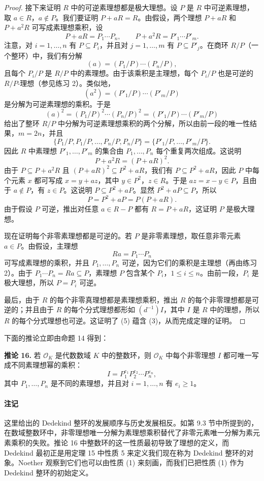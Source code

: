 \begin{proof}
接下来证明 $R$ 中的可逆素理想都是极大理想。设 $P$ 是 $R$ 中可逆素理想，取 $a\in R$，$a\notin P$。我们要证明 $P+aR=R$。由假设，两个理想 $P+aR$ 和 $P+a^2R$ 可写成素理想乘积，设
\[
  P+aR=P_1\cdots P_n,
  \qquad
  P+a^2R=P'_1\cdots P'_m.
\]
注意，对 $i=1,
\ldots,n$ 有 $P\subseteq P_i$，并且对 $j=1,
\ldots,m$ 有 $P\subseteq P'_j$。在商环 $R/P$（一个整环）中，我们有分解
\[
  (a)=(P_1/P)\cdots(P_n/P),
\]
且每个 $P_i/P$ 是 $R/P$ 中的素理想。由于该乘积是主理想，每个 $P_i/P$ 也是可逆的 $R/P$-理想（参见练习 2）。类似地，
\[
  (a^2)=(P'_1/P)\cdots(P'_m/P)
\]
是分解为可逆素理想的乘积。于是
\[
  (a)^2=(P_1/P)^2\cdots(P_n/P)^2=(P'_1/P)\cdots(P'_m/P)
\]
给出了整环 $R/P$ 中分解为可逆素理想乘积的两个分解，所以由前一段的唯一性结果，$m=2n$，并且
\[
  \{P_1/P,P_1/P,
  \ldots,P_n/P,P_n/P\}=\{P'_1/P,
  \ldots,P'_m/P\}.
\]
因此 $R$ 中素理想 $P'_1,
\ldots,P'_m$ 的集合由 $P_1,
\ldots,P_n$ 每个重复两次组成。这说明
\[
  P+a^2R=(P+aR)^2.
\]
由于 $P\subseteq P+a^2R$ 且 $(P+aR)^2\subseteq P^2+aR$，我们有 $P\subseteq P^2+aR$，因此 $P$ 中每个元素 $x$ 都可写成 $x=y+az$，其中 $y\in P^2$，$z\in R$。于是 $az=x-y\in P$，且由于 $a\notin P$，有 $z\in P$。这说明 $P\subseteq P^2+aP$。显然 $P^2+aP\subseteq P$，所以
\[
  P=P^2+aP=P(P+aR).
\]
由于假设 $P$ 可逆，推出对任意 $a\in R-P$ 都有 $R=P+aR$，这证明 $P$ 是极大理想。

现在证明每个非零素理想都是可逆的。若 $P$ 是非零素理想，取任意非零元素 $a\in P$。由假设，主理想
\[
  Ra=P_1\cdots P_n
\]
可写成素理想的乘积，并且 $P_1,
\ldots,P_n$ 可逆，因为它们的乘积是主理想（再由练习 2）。由于 $P_1\cdots P_n=Ra\subseteq P$，素理想 $P$ 包含某个 $P_i$，$1\leq i\leq n$。由前一段，$P_i$ 是极大理想，所以 $P=P_i$ 可逆。

最后，由于 $R$ 的每个非零真理想都是素理想乘积，推出 $R$ 的每个非零理想都是可逆的；并且由于 $R$ 的每个分式理想都形如 $(d^{-1})I$，其中 $I$ 是 $R$ 中的理想，所以 $R$ 的每个分式理想也可逆。这证明了 (5) 蕴含 (3)，从而完成定理的证明。
\end{proof}

下面的推论立即由命题 14 得到：

\medskip
\noindent\textbf{推论 16.} 若 $\mathcal O_K$ 是代数数域 $K$ 中的整数环，则 $\mathcal O_K$ 中每个非零理想 $I$ 都可唯一写成不同素理想幂的乘积：
\[
  I=P_1^{e_1}P_2^{e_2}\cdots P_n^{e_n},
\]
其中 $P_1,
\ldots,P_n$ 是不同的素理想，并且对 $i=1,
\ldots,n$ 有 $e_i\geq1$。

\paragraph{注记}
这里给出的 Dedekind 整环的发展顺序与历史发展相反。如第 9.3 节中所提到的，在数域整数环中，非零理想唯一分解为素理想乘积替代了非零元素唯一分解为素元素乘积的失败。推论 16 中整数环的这一性质最初导致了理想的定义，而 Dedekind 最初正是用定理 15 中性质 5 来定义我们现在称为 Dedekind 整环的对象。Noether 观察到它们也可以由性质 (1) 来刻画，而我们已把性质 (1) 作为 Dedekind 整环的初始定义。

